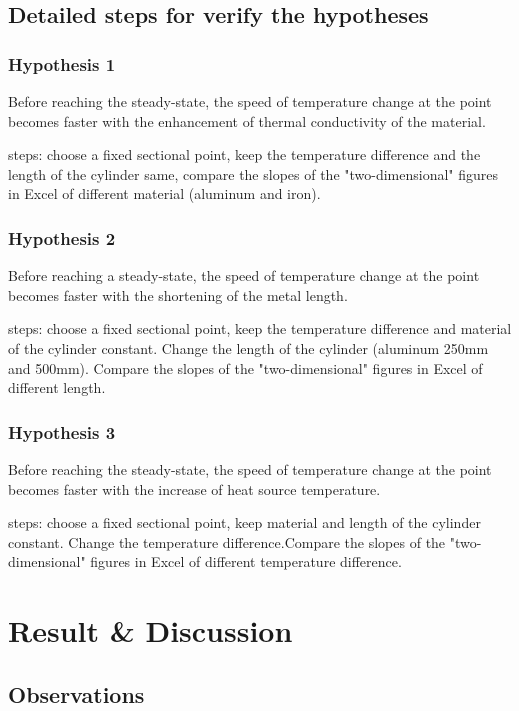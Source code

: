 \documentclass[12pt]{article}
\numberwithin{equation}{section}
\begin{document}
\subsection{Detailed steps for verify the hypotheses}
\subsubsection{Hypothesis 1}
Before reaching the steady-state, the speed of temperature change at the point becomes faster with the enhancement of thermal conductivity of the material.   

 
steps: choose a fixed sectional point, keep the temperature difference and the length of the cylinder same, compare the slopes of the "two-dimensional" figures in Excel of different material (aluminum and iron).
\subsubsection{Hypothesis 2}
Before reaching a steady-state, the speed of temperature change at the point becomes faster with the shortening of the metal length.  

  
steps: choose a fixed sectional point, keep the temperature difference and material of the cylinder constant. Change the length of the cylinder (aluminum 250mm and 500mm). Compare the slopes of the "two-dimensional" figures in Excel of different length.
\subsubsection{Hypothesis 3}
Before reaching the steady-state, the speed of temperature change at the point becomes faster with the increase of heat source temperature.  

   
steps: choose a fixed sectional point, keep material and length of the cylinder constant. Change the temperature difference.Compare the slopes of the "two-dimensional" figures in Excel of different temperature difference.

\section{Result \& Discussion}

\subsection{Observations}
\end{document}
